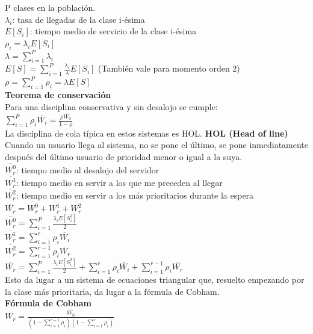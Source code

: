 \begin{minipage}{.22\textwidth}
	P clases en la población. \\
	$\lambda_i$: tasa de llegadas de la clase i-ésima \\
	$E[S_i]$: tiempo medio de servicio de la clase i-ésima \\
	$\rho_i=\lambda_i{E[S_i]}$ \\
	$\lambda=\sum\limits_{i=1}^P{\lambda_i}$ \\
	$E[S]=\sum_{i=1}^P{\frac{\lambda_i}{\lambda}}E[S_i]$ (También vale para momento orden 2) \\
	$\rho=\sum\limits_{i=1}^P{\rho_i}=\lambda{E[S]}$ \\
	{\bf Teorema de conservación} \\
	Para una disciplina conservativa y sin desalojo se cumple: \\
	$\sum\limits_{i=1}^P{\rho_i}{\overline{W_i}}=\frac{\rho\overline{W_0}}{1-\rho}$ \\
	La disciplina de cola típica en estos sistemas es HOL.
		{\bf HOL (Head of line)} \\
	Cuando un usuario llega al sistema, no se pone el último, se pone inmediatamente después del último usuario de prioridad menor o igual a la suya. \\
	$\overline{W_r^0}$: tiempo medio al desalojo del servidor \\
	$\overline{W_r^1}$: tiempo medio en servir a los que me preceden al llegar \\
	$\overline{W_r^2}$: tiempo medio en servir a los más prioritarios durante la espera \\
	$\overline{W_r}=\overline{W_r^0}+\overline{W_r^1}+\overline{W_r^2}$ \\
	$\overline{W_r^0}=\sum\limits_{i=1}^P\frac{\lambda_i{E[S_i^2]}}{2}$ \\
	$\overline{W_r^1} =\sum\limits_{i=1}^r{\rho_i \overline{W_i}}$ \\
	$\overline{W_r^2} =\sum\limits_{i=1}^{r-1}{\rho_i \overline{W_r}}$ \\
	$\overline{W_r}=\sum\limits_{i=1}^P\frac{\lambda_i{E[S_i^2]}}{2}+\sum\limits_{i=1}^r{\rho_i \overline{W_i}}+\sum\limits_{i=1}^{r-1}{\rho_i \overline{W_r}}$ \\
	Esto da lugar a un sistema de ecuaciones triangular que, resuelto empezando por la clase más prioritaria, da lugar a la fórmula de Cobham.\\
	{\bf Fórmula de Cobham} \\
	$\overline{W_r}=\frac{\overline{W_0}}{(1-\sum_{i=1}^{r-1}{\rho_i})(1-\sum_{i=1}^{r}{\rho_i})}$ \\
\end{minipage}

